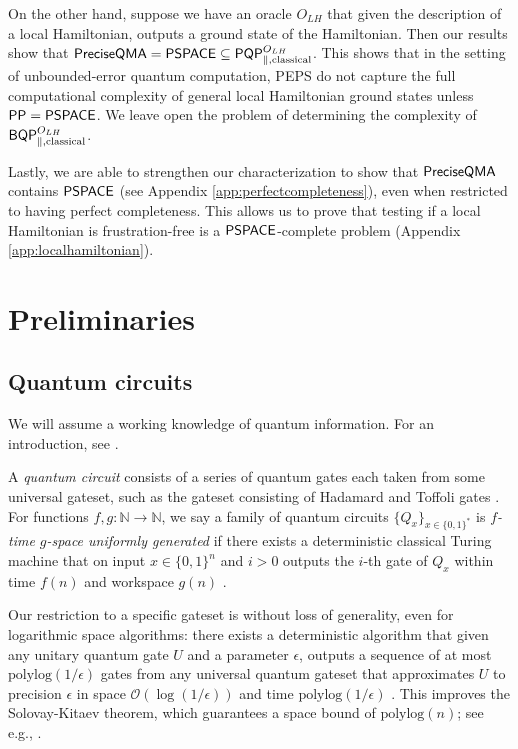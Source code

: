 \documentclass[11pt]{article}
\newtheorem{theorem}{Theorem}
\theoremstyle{definition}
\theoremstyle{remark}
\newcommand\PSPACE{{\sf{PSPACE}}}
\newcommand\PP{\sf{PP}}
\newcommand\BQP{{\sf{BQP}}}
\newcommand\PQP{{\sf{PQP}}}
\newcommand\QMAexp{{\sf{PreciseQMA}}}
\newcommand\bigoh{\mathcal{O}}
\newcommand{\polylog}{\textrm{polylog}}
\begin{document}
On the other hand, suppose we have an oracle $O_{LH}$ that given the description of a local Hamiltonian, outputs a ground state of the Hamiltonian. Then our results show that $\QMAexp = \PSPACE \subseteq \PQP^{O_{LH}}_{\parallel,\text{classical}}$. This shows that in the setting of unbounded-error quantum computation, PEPS do not capture the full computational complexity of general local Hamiltonian ground states unless $\PP=\PSPACE$. We leave open the problem of determining the complexity of $\BQP^{O_{LH}}_{\parallel,\text{classical}}$.

Lastly, we are able to strengthen our characterization to show that $\QMAexp$ contains $\PSPACE$ (see Appendix \ref{app:perfectcompleteness}), even when restricted to having perfect completeness.  This allows us to prove that testing if a local Hamiltonian is frustration-free is a $\PSPACE$-complete problem (Appendix \ref{app:localhamiltonian}).
 \section{Preliminaries}
\subsection{Quantum circuits}
We will assume a working knowledge of quantum information. For an introduction, see \cite{nc00}.

A \emph{quantum circuit} consists of a series of quantum gates each taken from some universal gateset, such as the gateset consisting of Hadamard and Toffoli gates \cite{shi}. %
 For functions $f,g:\mathbb{N}\rightarrow\mathbb{N}$, we say a family of quantum circuits $\{Q_x\}_{x\in\{0,1\}^*}$ is \emph{$f$-time $g$-space uniformly generated} if there exists a deterministic classical Turing machine that on input $x\in\{0,1\}^n$ and $i>0$ outputs the $i$-th gate of $Q_x$ within time $f(n)$ and workspace $g(n)$ \cite{nc00}.  
 
Our restriction to a specific gateset is without loss of generality, even for logarithmic space algorithms:  there exists a deterministic algorithm that given any unitary quantum gate $U$ and a parameter $\epsilon$, outputs a sequence of at most $\polylog({1/\epsilon})$ gates from any universal quantum gateset that approximates $U$ to precision $\epsilon$ in space $\bigoh({\log({1/\epsilon})})$ and time $\polylog({1/\epsilon})$ \cite{mw12}.  This improves the Solovay-Kitaev theorem, which guarantees a space bound of $\polylog(n)$; see e.g., \cite{nc00}.
\end{document}
